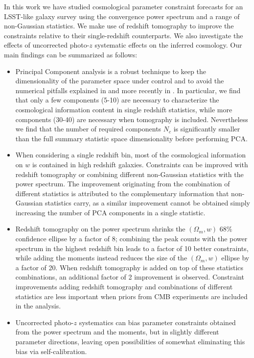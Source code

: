 \documentclass[reprint,aps,prd,superscriptaddress,showkeys,showpacs]{revtex4-1}
\begin{document}
In this work we have studied cosmological parameter constraint forecasts for an LSST-like galaxy survey using the convergence power spectrum and a range of non-Gaussian statistics. We make use of redshift tomography to improve the constraints relative to their single-redshift counterparts. We also investigate the effects of uncorrected photo-$z$ systematic effects on the inferred cosmology. Our main findings can be summarized as follows:
\begin{itemize}
	
	\item Principal Component analysis is a robust technique to keep the dimensionality of the parameter space under control and to avoid the numerical pitfalls explained in \citep{Taylor12,DodelsonSchneider13,Taylor14} and more recently in \citep{PetriVariance}. In particular, we find that only a few components (5-10) are necessary to characterize the cosmological information content in single redshift statistics, while more components (30-40) are necessary when tomography is included. Nevertheless we find that the number of required components $N_c$ is significantly smaller than the full summary statistic space dimensionality before performing PCA.
	
	\item When considering a single redshift bin, most of the cosmological information on $w$ is contained in high redshift galaxies. Constraints can be improved with redshift tomography or combining different non-Gaussian statistics with the power spectrum. The improvement originating from the combination of different statistics is attributed to the complementary information that non-Gaussian statistics carry, as a similar improvement cannot be obtained simply increasing the number of PCA components in a single statistic.    
	
	\item Redshift tomography on the power spectrum shrinks the $(\Omega_m,w)$ 68\% confidence ellipse by a factor of 8; combining the peak counts with the power spectrum in the highest redshift bin leads to a factor of 10 better constraints, while adding the moments instead reduces the size of the $(\Omega_m,w)$ ellipse by a factor of 20. When redshift tomography is added on top of these statistics combinations, an additional factor of 2 improvement is observed. Constraint improvements adding redshift tomography and combinations of different statistics are less important when priors from CMB experiments are included in the analysis. 

	\item Uncorrected photo-$z$ systematics can bias parameter constraints obtained from the power spectrum and the moments, but in slightly different parameter directions, leaving open possibilities of somewhat eliminating this bias via self-calibration. 

\end{itemize}
\end{document}
